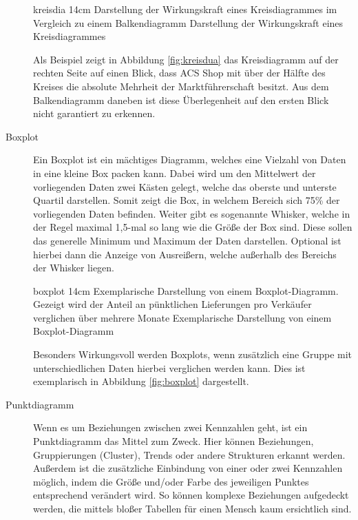 \begin{description}
\bild
{kreisdia}
{14cm}
{Darstellung der Wirkungskraft eines Kreisdiagrammes im Vergleich zu einem Balkendiagramm}
{Darstellung der Wirkungskraft eines Kreisdiagrammes}

Als Beispiel zeigt in Abbildung \ref{fig:kreisdua} das Kreisdiagramm auf der rechten Seite auf einen Blick, dass \glqq ACS Shop\grqq{} mit über der Hälfte des Kreises die absolute Mehrheit der Marktführerschaft besitzt.
Aus dem Balkendiagramm daneben ist diese Überlegenheit auf den ersten Blick nicht garantiert zu erkennen.

\item[Boxplot] Ein Boxplot ist ein mächtiges Diagramm, welches eine Vielzahl von Daten in eine kleine \glqq Box\grqq{} packen kann.
Dabei wird um den Mittelwert der vorliegenden Daten zwei Kästen gelegt, welche das oberste und unterste Quartil darstellen.
Somit zeigt die \glqq Box\grqq{}, in welchem Bereich sich 75\% der vorliegenden Daten befinden.
Weiter gibt es sogenannte \glqq Whisker\grqq{}, welche in der Regel maximal 1,5-mal so lang wie die Größe der Box sind. 
Diese sollen das generelle Minimum und Maximum der Daten darstellen.
Optional ist hierbei dann die Anzeige von Ausreißern, welche außerhalb des Bereichs der Whisker liegen.

\bild
{boxplot}
{14cm}
{Exemplarische Darstellung von einem Boxplot-Diagramm. Gezeigt wird der Anteil an pünktlichen Lieferungen pro Verkäufer verglichen über mehrere Monate}
{Exemplarische Darstellung von einem Boxplot-Diagramm}

Besonders Wirkungsvoll werden Boxplots, wenn zusätzlich eine Gruppe mit unterschiedlichen Daten hierbei verglichen werden kann.
Dies ist exemplarisch in Abbildung \ref{fig:boxplot} dargestellt.
\item[Punktdiagramm] Wenn es um Beziehungen zwischen zwei Kennzahlen geht, ist ein Punktdiagramm das Mittel zum Zweck.
Hier können Beziehungen, Gruppierungen (Cluster), Trends oder andere Strukturen erkannt werden.
Außerdem ist die zusätzliche Einbindung von einer oder zwei Kennzahlen möglich, indem die Größe und/oder Farbe des jeweiligen Punktes entsprechend verändert wird.
So können komplexe Beziehungen aufgedeckt werden, die mittels bloßer Tabellen für einen Mensch kaum ersichtlich sind.
\end{description}

